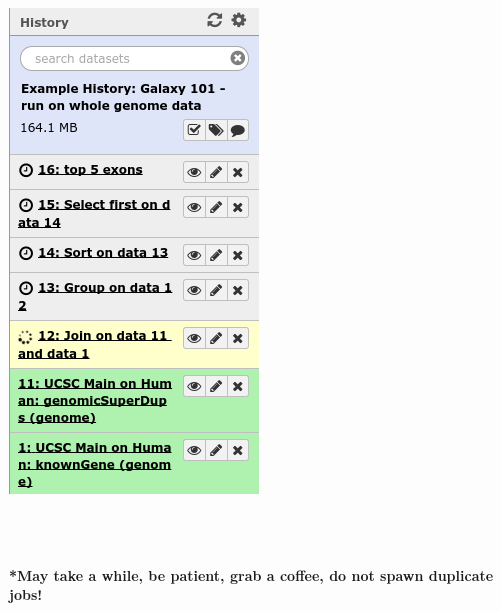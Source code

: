 \documentclass{beamer}              %
\begin{document}
\begin{frame}
\begin{columns}[T]
\begin{column}{.18\textwidth}
		\includegraphics[width=\textwidth,right]{figures/101p_04a.png}
    \end{column}
  \end{columns}
  \ \\
  \ \\
  {\scriptsize \textbf{*May take a while, be patient, grab a coffee, do not spawn duplicate jobs!}}
\end{frame}
\end{document}
